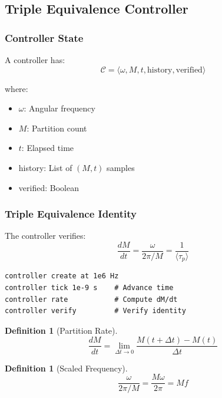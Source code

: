 \documentclass[twocolumn,10pt]{article}
\theoremstyle{definition}
\newtheorem{definition}[theorem]{Definition}
\theoremstyle{remark}
\begin{document}
\subsection{Triple Equivalence Controller}

\subsubsection{Controller State}

A controller has:
\begin{equation}
    \mathcal{C} = \langle\omega, M, t, \text{history}, \text{verified}\rangle
\end{equation}

where:
\begin{itemize}
    \item $\omega$: Angular frequency
    \item $M$: Partition count
    \item $t$: Elapsed time
    \item history: List of $(M, t)$ samples
    \item verified: Boolean
\end{itemize}

\subsubsection{Triple Equivalence Identity}

The controller verifies:
\begin{equation}
    \frac{dM}{dt} = \frac{\omega}{2\pi/M} = \frac{1}{\langle\tau_p\rangle}
\end{equation}

\begin{lstlisting}
controller create at 1e6 Hz
controller tick 1e-9 s    # Advance time
controller rate           # Compute dM/dt
controller verify         # Verify identity
\end{lstlisting}

\begin{definition}[Partition Rate]
\begin{equation}
    \frac{dM}{dt} = \lim_{\Delta t \to 0} \frac{M(t + \Delta t) - M(t)}{\Delta t}
\end{equation}
\end{definition}

\begin{definition}[Scaled Frequency]
\begin{equation}
    \frac{\omega}{2\pi/M} = \frac{M\omega}{2\pi} = Mf
\end{equation}
\end{definition}
\end{document}
